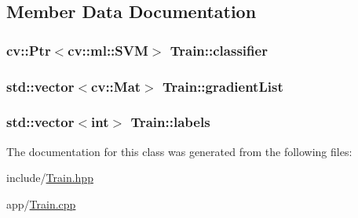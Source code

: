 \subsection{Member Data Documentation}
\subsubsection[{\texorpdfstring{classifier}{classifier}}]{\setlength{\rightskip}{0pt plus 5cm}cv\+::\+Ptr$<$cv\+::ml\+::\+S\+VM$>$ Train\+::classifier}\hypertarget{classTrain_af48556029dbb829b97e52a47c38f5dec}{}\label{classTrain_af48556029dbb829b97e52a47c38f5dec}
\subsubsection[{\texorpdfstring{gradient\+List}{gradientList}}]{\setlength{\rightskip}{0pt plus 5cm}std\+::vector$<$cv\+::\+Mat$>$ Train\+::gradient\+List}\hypertarget{classTrain_ae4c540cf58c0252745f527f7aca267d4}{}\label{classTrain_ae4c540cf58c0252745f527f7aca267d4}
\subsubsection[{\texorpdfstring{labels}{labels}}]{\setlength{\rightskip}{0pt plus 5cm}std\+::vector$<$int$>$ Train\+::labels}\hypertarget{classTrain_a94e850beee52059be00a4fd9068cb223}{}\label{classTrain_a94e850beee52059be00a4fd9068cb223}


The documentation for this class was generated from the following files\+:\begin{DoxyCompactItemize}
\item 
include/\hyperlink{Train_8hpp}{Train.\+hpp}\item 
app/\hyperlink{Train_8cpp}{Train.\+cpp}\end{DoxyCompactItemize}
